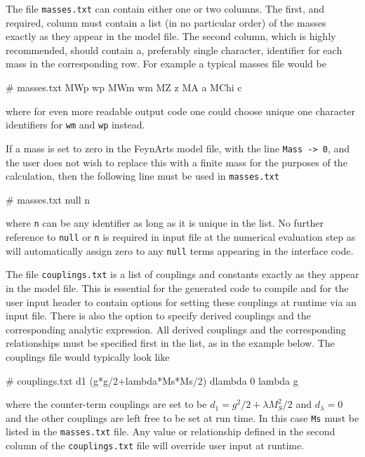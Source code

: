 The file \lstinline{masses.txt} can contain either one or two columns.  The first, and required, column must contain a list (in no particular order) of the masses exactly as they appear in the \feynarts model file.  The second column, which is highly recommended, should contain a, preferably single character, identifier for each mass in the corresponding row.  For example a typical masses file would be
\begin{lstterm}
# masses.txt
MWp          wp
MWm          wm
MZ           z
MA           a
MChi	       c
\end{lstterm}
where for even more readable output code one could choose unique one character identifiers for \lstinline{wm} and \lstinline{wp} instead.

If a mass is set to zero in the FeynArts model file, with the line \lstinline{Mass -> 0}, and the user does not wish to replace this with a finite mass for the purposes of the calculation, then the following line must be used in \lstinline{masses.txt}
\begin{lstterm}
# masses.txt
null n
\end{lstterm}
where \lstinline{n} can be any identifier as long as it is unique in the list.  No further reference to \lstinline{null} or \lstinline{n} is required in input file at the numerical evaluation step as \mb will automatically assign zero to any \lstinline{null} terms appearing in the \tsil interface code.


The file \lstinline{couplings.txt} is a list of couplings and constants exactly as they appear in the \feynarts model file.  This is essential for the generated code to compile and for the user input header to contain options for setting these couplings at runtime via an input file.  There is also the option to specify derived couplings and the corresponding analytic expression.  All derived couplings and the corresponding relationships must be specified first in the list, as in the example below.  The couplings file would typically look like
\begin{lstterm}
# couplings.txt
d1 (g*g/2+lambda*Ms*Ms/2)
dlambda 0
lambda
g
\end{lstterm}
where the counter-term couplings are set to be $d_1=g^2/2 + \lambda M_S^2/2$ and $d_{\lambda}=0$ and the other couplings are left free to be set at run time.  In this case \lstinline{Ms} must be listed in the \lstinline{masses.txt} file.  Any value or relationship defined in the second column of the \lstinline{couplings.txt} file will override user input at runtime.


